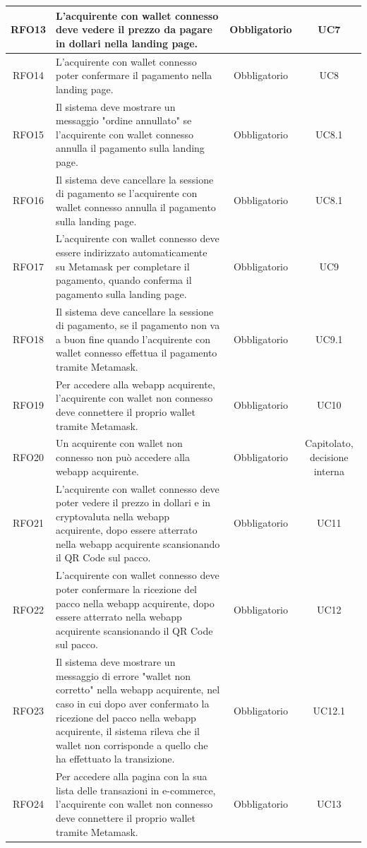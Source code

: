 \documentclass[a4paper, 12pt]{article}
\begin{document}
\begin{longtable}{|c|p{5cm}|c|c|}
\hline
RFO13 & L'acquirente con wallet connesso deve vedere il prezzo da pagare in dollari nella landing page. & Obbligatorio & UC7 \\
\hline
RFO14 & L'acquirente con wallet connesso poter confermare il pagamento nella landing page. & Obbligatorio & UC8 \\
\hline
RFO15 & Il sistema deve mostrare un messaggio "ordine annullato" se l'acquirente con wallet connesso annulla il pagamento sulla landing page. & Obbligatorio & UC8.1 \\
\hline
RFO16 & Il sistema deve cancellare la sessione di pagamento se l'acquirente con wallet connesso annulla il pagamento sulla landing page. & Obbligatorio & UC8.1 \\
\hline
RFO17 & L'acquirente con wallet connesso deve essere indirizzato automaticamente su Metamask per completare il pagamento, quando conferma il pagamento sulla landing page. & Obbligatorio & UC9 \\
\hline
RFO18 & Il sistema deve cancellare la sessione di pagamento, se il pagamento non va a buon fine quando l'acquirente con wallet connesso effettua il pagamento tramite Metamask. & Obbligatorio & UC9.1 \\
\hline
RFO19 & Per accedere alla webapp acquirente, l'acquirente con wallet non connesso deve connettere il proprio wallet tramite Metamask. & Obbligatorio & UC10 \\
\hline
RFO20 & Un acquirente con wallet non connesso non può accedere alla webapp acquirente. & Obbligatorio & Capitolato, decisione interna \\
\hline
RFO21 & L'acquirente con wallet connesso deve poter vedere il prezzo in dollari e in cryptovaluta nella webapp acquirente, dopo essere atterrato nella webapp acquirente scansionando il QR Code sul pacco. & Obbligatorio & UC11 \\
\hline
RFO22 & L'acquirente con wallet connesso deve poter confermare la ricezione del pacco nella webapp acquirente, dopo essere atterrato nella webapp acquirente scansionando il QR Code sul pacco. & Obbligatorio & UC12 \\
\hline
RFO23 & Il sistema deve mostrare un messaggio di errore "wallet non corretto" nella webapp acquirente, nel caso in cui dopo aver confermato la ricezione del pacco nella webapp acquirente, il sistema rileva che il wallet non corrisponde a quello che ha effettuato la transizione. & Obbligatorio & UC12.1 \\
\hline
RFO24 & Per accedere alla pagina con la sua lista delle transazioni in e-commerce, l'acquirente con wallet non connesso deve connettere il proprio wallet tramite Metamask. & Obbligatorio & UC13 \\

\end{longtable}
\end{document}
